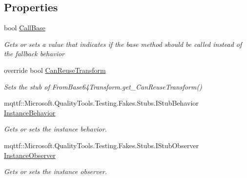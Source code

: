 \subsection*{Properties}
\begin{DoxyCompactItemize}
\item 
bool \hyperlink{class_system_1_1_security_1_1_cryptography_1_1_fakes_1_1_stub_from_base64_transform_a1bf4745829f3e2d8bd45980d8aab4b80}{Call\-Base}
\begin{DoxyCompactList}\small\item\em Gets or sets a value that indicates if the base method should be called instead of the fallback behavior\end{DoxyCompactList}\item 
override bool \hyperlink{class_system_1_1_security_1_1_cryptography_1_1_fakes_1_1_stub_from_base64_transform_ac52c0e17d1e3cd6a7dc624df274207b6}{Can\-Reuse\-Transform}
\begin{DoxyCompactList}\small\item\em Sets the stub of From\-Base64\-Transform.\-get\-\_\-\-Can\-Reuse\-Transform()\end{DoxyCompactList}\item 
mqttf\-::\-Microsoft.\-Quality\-Tools.\-Testing.\-Fakes.\-Stubs.\-I\-Stub\-Behavior \hyperlink{class_system_1_1_security_1_1_cryptography_1_1_fakes_1_1_stub_from_base64_transform_a09e913c10074d1053920675e170866a8}{Instance\-Behavior}
\begin{DoxyCompactList}\small\item\em Gets or sets the instance behavior.\end{DoxyCompactList}\item 
mqttf\-::\-Microsoft.\-Quality\-Tools.\-Testing.\-Fakes.\-Stubs.\-I\-Stub\-Observer \hyperlink{class_system_1_1_security_1_1_cryptography_1_1_fakes_1_1_stub_from_base64_transform_a4e1b3cddd638db8c355f7ed3a62e78b3}{Instance\-Observer}
\begin{DoxyCompactList}\small\item\em Gets or sets the instance observer.\end{DoxyCompactList}\end{DoxyCompactItemize}



